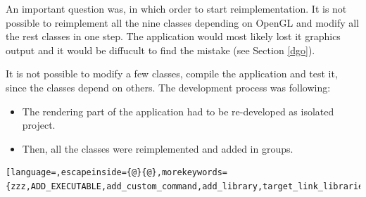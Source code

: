 An important question was, in which order to start reimplementation. It is not possible to reimplement all the nine classes depending on OpenGL and modify all the rest classes in one step. The application would most likely lost it graphics output and it would be diffucult to find the mistake (see Section \ref{dgo}).

It is not possible to modify a few classes, compile the application and test it, since the classes depend on others. The development process was following:

\begin{itemize}
\item The rendering part of the application had to be re-developed as isolated project.
\item Then, all the classes were reimplemented and added in groups.
\end{itemize} 


\begin{lstlisting}[language=,escapeinside={@}{@},morekeywords={zzz,ADD_EXECUTABLE,add_custom_command,add_library,target_link_libraries,OUTPUT,COMMAND,xxx})]
\end{lstlisting}
